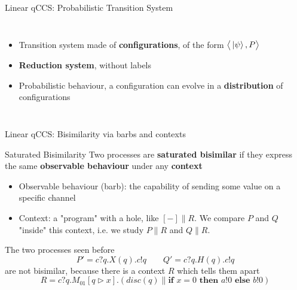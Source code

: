 \documentclass{beamer}
\newcommand{\kp}{\ket{\psi}}
\newcommand{\confw}[1]{\big\langle#1\big\rangle}
\newcommand{\blank}{{-}}
\newcommand{\ite}[3]{\textbf{if } #1 \textbf{ then } #2 \textbf{ else } #3}
\begin{document}
\begin{frame}{Linear qCCS: Probabilistic Transition System}
\begin{columns}
\begin{itemize}
\item<1-> Transition system made of \textbf{configurations}, of the form $\confw{\kp, P}$
\item<2-> \textbf{Reduction system}, without labels
\item<3-> Probabilistic behaviour, a configuration can evolve in a \textbf{distribution} of configurations
\end{itemize}

\end{columns}
\end{frame}


\begin{frame}{Linear qCCS: Bisimilarity via barbs and contexts}

\begin{block}{Saturated Bisimilarity}
Two processes are \textbf{saturated bisimilar} if they express the same \textbf{observable behaviour} under any \textbf{context} 
\pause
\begin{itemize}
\item 
Observable behaviour (barb): the capability of sending some value on a specific channel
\pause
\item Context: a "program" with a hole, like $[\blank] \parallel R$. We compare $P$ and $Q$ "inside" this context, i.e. we study $P \parallel R$ and $Q \parallel R$.
\end{itemize}
\end{block}


\pause
The two processes seen before \[
 P' = c?q.X(q).c!q \qquad Q' = c?q.H(q).c!q
\]
are not bisimilar, because there is a context $R$ which tells them apart
\[ R = c?q.M_{01}[q \rhd x].\left( disc(q)\parallel \ite{x = 0}{a!0}{b!0}\right)\]

\end{frame}
\end{document}
